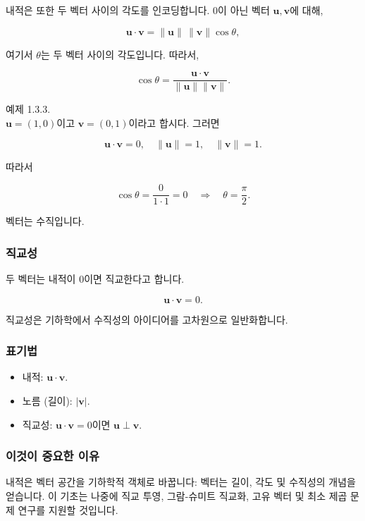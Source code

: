 \documentclass[
  12pt,
  a4paper,
]{article}
\begin{document}
내적은 또한 두 벡터 사이의 각도를 인코딩합니다. 0이 아닌 벡터 \(\mathbf{u}, \mathbf{v}\)에 대해,

\[\mathbf{u} \cdot \mathbf{v} = \|\mathbf{u}\| \, \|\mathbf{v}\| \cos \theta,\]

여기서 \(\theta\)는 두 벡터 사이의 각도입니다. 따라서,

\[\cos \theta = \frac{\mathbf{u} \cdot \mathbf{v}}{\|\mathbf{u}\|\|\mathbf{v}\|}.\]

예제 1.3.3.\\
\(\mathbf{u} = (1,0)\)이고 \(\mathbf{v} = (0,1)\)이라고 합시다. 그러면

\[\mathbf{u} \cdot \mathbf{v} = 0, \quad \|\mathbf{u}\| = 1, \quad \|\mathbf{v}\| = 1.\]

따라서

\[\cos \theta = \frac{0}{1\cdot 1} = 0 \quad \Rightarrow \quad \theta = \frac{\pi}{2}.\]

벡터는 수직입니다.

\subsubsection{직교성}\label{orthogonality}

두 벡터는 내적이 0이면 직교한다고 합니다.

\[\mathbf{u} \cdot \mathbf{v} = 0.\]

직교성은 기하학에서 수직성의 아이디어를 고차원으로 일반화합니다.

\subsubsection{표기법}\label{notation-3}

\begin{itemize}
\item
  내적: \(\mathbf{u} \cdot \mathbf{v}\).
\item
  노름 (길이): \(|\mathbf{v}|\).
\item
  직교성: \(\mathbf{u} \cdot \mathbf{v} = 0\)이면 \(\mathbf{u} \perp \mathbf{v}\).
\end{itemize}

\subsubsection{이것이 중요한 이유}\label{why-this-matters-2}

내적은 벡터 공간을 기하학적 객체로 바꿉니다: 벡터는 길이, 각도 및 수직성의 개념을 얻습니다. 이 기초는 나중에 직교 투영, 그람-슈미트 직교화, 고유 벡터 및 최소 제곱 문제 연구를 지원할 것입니다.
\end{document}
